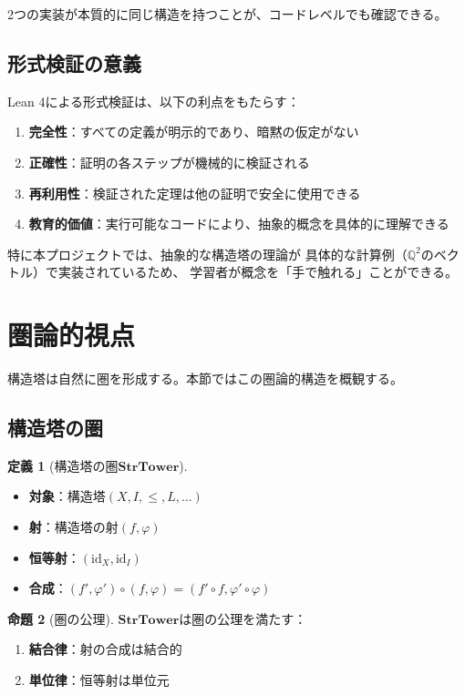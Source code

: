 \documentclass[a4paper,12pt]{ltjsarticle}
\theoremstyle{definition}
\newtheorem{definition}{定義}[section]
\newtheorem{proposition}[definition]{命題}
\begin{document}
2つの実装が本質的に同じ構造を持つことが、コードレベルでも確認できる。

\subsection{形式検証の意義}

Lean 4による形式検証は、以下の利点をもたらす：

\begin{enumerate}
\item \textbf{完全性}：すべての定義が明示的であり、暗黙の仮定がない
\item \textbf{正確性}：証明の各ステップが機械的に検証される
\item \textbf{再利用性}：検証された定理は他の証明で安全に使用できる
\item \textbf{教育的価値}：実行可能なコードにより、抽象的概念を具体的に理解できる
\end{enumerate}

特に本プロジェクトでは、抽象的な構造塔の理論が
具体的な計算例（$\mathbb{Q}^2$のベクトル）で実装されているため、
学習者が概念を「手で触れる」ことができる。

\section{圏論的視点}

構造塔は自然に圏を形成する。本節ではこの圏論的構造を概観する。

\subsection{構造塔の圏}

\begin{definition}[構造塔の圏$\mathbf{StrTower}$]
\begin{itemize}
\item \textbf{対象}：構造塔$(X, I, \leq, L, \ldots)$
\item \textbf{射}：構造塔の射$(f, \varphi)$
\item \textbf{恒等射}：$(\mathrm{id}_X, \mathrm{id}_I)$
\item \textbf{合成}：$(f', \varphi') \circ (f, \varphi) = (f' \circ f, \varphi' \circ \varphi)$
\end{itemize}
\end{definition}

\begin{proposition}[圏の公理]
$\mathbf{StrTower}$は圏の公理を満たす：
\begin{enumerate}
\item \textbf{結合律}：射の合成は結合的
\item \textbf{単位律}：恒等射は単位元
\end{enumerate}
\end{proposition}
\end{document}
